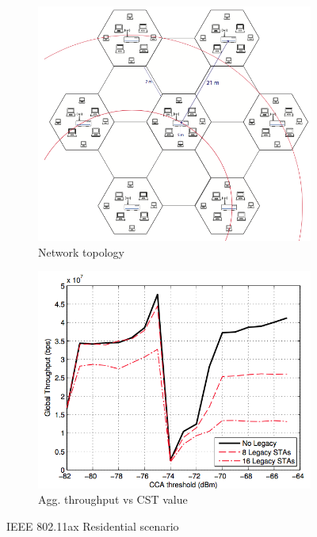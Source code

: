 \documentclass[12pt, a4paper,twoside]{tesi_upf}
\begin{document}
			\begin{figure}[t!]
				\centering
				\begin{subfigure}[b]{0.375\textwidth}
					\includegraphics[width=\textwidth]{images/jamil2014_1}
					\caption{Network topology}
					\label{fig:jamil_2014_1}
				\end{subfigure}
				\begin{subfigure}[b]{0.425\textwidth}
					\includegraphics[width=\textwidth]{images/jamil2014_2}
					\caption{Agg. throughput vs CST value}
					\label{fig:jamil_2014_2}
				\end{subfigure}		
				\caption{IEEE 802.11ax Residential scenario}
				\label{fig:jamil_2014}
			\end{figure}		
		
\end{document}
